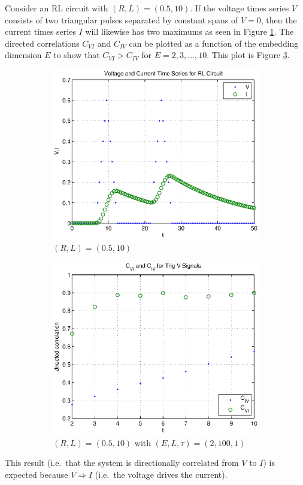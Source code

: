 \documentclass[a4paper,11pt]{article}
\begin{document}
Consider an RL circuit with $(R,L) = (0.5,10)$.  If the voltage times series $V$ consists of two triangular pulses separated by constant spans of $V=0$, then the current times series $I$ will likewise has two maximums as seen in Figure \ref{fig:RL_trigsignals}.  The directed correlations $C_{VI}$ and $C_{IV}$ can be plotted as a function of the embedding dimension $E$ to show that $C_{VI}>C_{IV}$ for $E=2,3,\ldots,10$.  This plot is Figure \ref{fig:RL_trigsignalsCCM}.
\begin{figure}[h!t]
\centering
\begin{subfigure}[b]{0.4\textwidth}
\label{fig:RL_trigsignals}
\includegraphics[scale=0.55]{RL_trigsignals.eps}
\caption{$(R,L) = (0.5,10)$}
\end{subfigure}
\begin{subfigure}[b]{0.4\textwidth}
\label{fig:RL_trigsignalsCCM}
\includegraphics[scale=0.55]{RL_trigsignalsCCM.eps}
\caption{$(R,L) = (0.5,10)$ with $\left(E,L,\tau\right)=\left(2,100,1\right)$}
\end{subfigure}
\caption{}
\end{figure}
This result (i.e.\ that the system is directionally correlated from $V$ to $I$) is expected because $V\Rightarrow I$ (i.e.\ the voltage drives the current).
\end{document}
